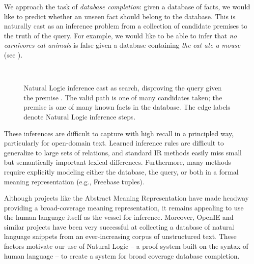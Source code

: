 We approach the task of \textit{database completion}: given a
  database of facts, we would like to predict whether an unseen fact
  should belong to the database.
This is naturally cast as an inference problem from 
  a collection of candidate premises to the truth of the query.
For example, we would like to be able to infer 
  that \textit{no carnivores eat animals}
  is false given a database containing \textit{the cat ate a mouse}
  (see ).

\begin{figure}[th]
\begin{center}
  \resizebox{0.48\textwidth}{!}{\teaserSearch} \\
\end{center}
\caption{
  Natural Logic inference cast as search, disproving the
    query  given the premise
    .
  The valid path is one of many candidates taken; the premise
    is one of many known facts in the database.
  The edge labels denote Natural Logic inference steps.
  \label{fig:teaser}
}
\end{figure}

These inferences are difficult to capture with high recall 
  in a principled way, particularly for open-domain text.
Learned inference rules are difficult to generalize to large sets of
  relations, and standard IR methods easily miss small but
  semantically important lexical differences.
Furthermore, many methods require explicitly modeling either the
  database, the query, or both in a formal meaning representation
  (e.g., Freebase tuples).

Although projects like the Abstract Meaning Representation
  \cite{key:2013banarescu-amr} have made headway providing a
  broad-coverage meaning representation, it remains 
  appealing to use the human language itself as the vessel for
  inference.
Moreover, OpenIE and similar projects have been very successful at
  collecting a database of natural language snippets
  from an ever-increasing corpus of unstructured text.
These factors motivate our use of Natural Logic -- a proof system built
  on the syntax of human language -- to create a system for
  broad coverage database completion.

